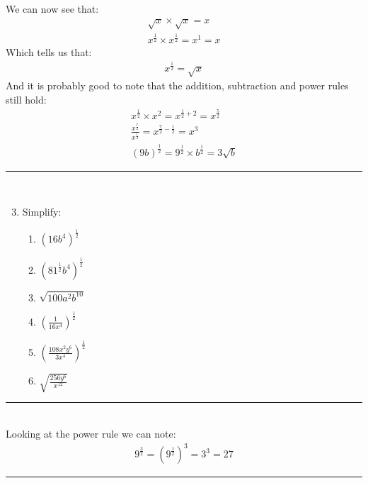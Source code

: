 \documentclass[a4paper,12pt]{article}
\newcommand\questionend{
	\rule[0pt]{17cm}{0.5pt}\vspace{-0.5cm}\\
}
\begin{document}
We can now see that:
\begin{align*}
	\sqrt{x} \times \sqrt{x} = x\\
	x^{\frac{1}{2}} \times x^{\frac{1}{2}}  = x^1 = x
\end{align*}
Which tells us that:
\begin{align*}
x^{\frac{1}{2}}  = \sqrt{x}
\end{align*}
And it is probably good to note that the addition, subtraction and power rules still hold:
\begin{align*}
	x^{\frac{1}{2}} \times x^{2}   = x^{\frac{1}{2} + 2} = x^{ \frac{5}{2}  }\\
		\frac{ x^{ \frac{7}{2} }  }{ x^{  \frac{1}{2} }  }  = x^{ \frac{7}{2} -  \frac{1}{2} } = x^{3}\\
		(9b)^{ \frac{1}{2} }= 9^{ \frac{1}{2} } \times b^{ \frac{1}{2} } = 3\sqrt{b}
\end{align*}

\questionend
\newpage

\begin{enumerate}[label=\normalsize \arabic*)~~~ , leftmargin=1cm]
	\setcounter{enumi}{2}
\item Simplify:
\begin{multicols}{3}
	\begin{enumerate}[label=\normalsize \alph*)~~~ , topsep=8pt,itemsep=5pt,partopsep=4pt, parsep=4pt]
		\item $\displaystyle \left(16b^4 \right)^{ \frac{1}{2} } $
		\item  $\displaystyle \left(81^{\frac{1}{2}} b^4 \right)^{ \frac{1}{2} } $
		\item  $\displaystyle \sqrt{100a^2b^{10}} $
		\item $\displaystyle \left(  \frac{1}{16x^4} \right)^\frac{1}{2}  $
		\item $\displaystyle  \left(  \frac{108x^2y^6}{3x^4} \right)^\frac{1}{2} $
		\item $\displaystyle  \sqrt{ \frac{256y^6}{x^{12}} }$
	\end{enumerate}
\end{multicols}
\end{enumerate}

\questionend

Looking at the power rule we can note:
\begin{align*}
	9^{\frac{3}{2}} = \left( 9^{ \frac{1}{2} } \right)^3 = 3^3 = 27
\end{align*}

\questionend
\end{document}
